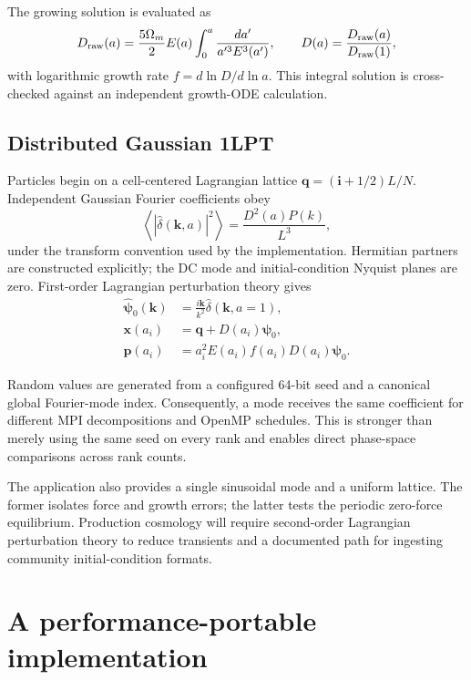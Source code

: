 \documentclass[11pt]{article}
\begin{document}
The growing solution is evaluated as
\begin{equation}
  D_{\rm raw}(a)=\frac{5\Omega_m}{2}E(a)
  \int_0^a\frac{da'}{a'^3E^3(a')},
  \qquad
  D(a)=\frac{D_{\rm raw}(a)}{D_{\rm raw}(1)},
  \label{eq:growth}
\end{equation}
with logarithmic growth rate $f=d\ln D/d\ln a$.  This integral solution is
cross-checked against an independent growth-ODE calculation.

\subsection{Distributed Gaussian 1LPT}

Particles begin on a cell-centered Lagrangian lattice
$\boldsymbol{q}=(\boldsymbol{i}+1/2)L/N$.  Independent Gaussian Fourier
coefficients obey
\begin{equation}
  \left\langle|\widehat\delta(\boldsymbol{k},a)|^2\right\rangle
  = \frac{D^2(a)P(k)}{L^3},
  \label{eq:fourier_variance}
\end{equation}
under the transform convention used by the implementation.  Hermitian partners
are constructed explicitly; the DC mode and initial-condition Nyquist planes
are zero.  First-order Lagrangian perturbation theory gives
\begin{align}
  \widehat{\boldsymbol{\psi}}_0(\boldsymbol{k})
    &= \frac{i\boldsymbol{k}}{k^2}\widehat\delta(\boldsymbol{k},a=1),\\
  \boldsymbol{x}(a_i)
    &= \boldsymbol{q}+D(a_i)\boldsymbol{\psi}_0,\\
  \boldsymbol{p}(a_i)
    &= a_i^2E(a_i)f(a_i)D(a_i)\boldsymbol{\psi}_0.
  \label{eq:1lpt}
\end{align}

Random values are generated from a configured 64-bit seed and a canonical
global Fourier-mode index.  Consequently, a mode receives the same coefficient
for different MPI decompositions and OpenMP schedules.  This is stronger than
merely using the same seed on every rank and enables direct phase-space
comparisons across rank counts.

The application also provides a single sinusoidal mode and a uniform lattice.
The former isolates force and growth errors; the latter tests the periodic
zero-force equilibrium.  Production cosmology will require second-order
Lagrangian perturbation theory to reduce transients and a documented path for
ingesting community initial-condition formats.

\section{A performance-portable implementation}
\label{sec:implementation}
\end{document}
